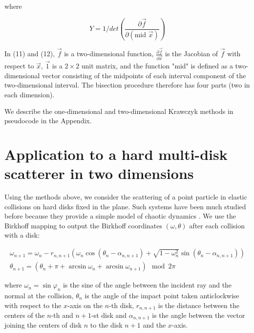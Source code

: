 \documentclass[pre, amsmath, amssymb, onecolumn, showpacs]{revtex4-1}
\begin{document}
\begin{equation}
[Equation (15) in odt draft]
\end{equation}

where

\begin{equation}
Y = 1 / det(\frac{\partial \overrightarrow{f}}{\partial (\text{mid } \overrightarrow{x})})
\end{equation}

In (11) and (12), $\overrightarrow{f}$ is a two-dimensional function, $\frac{\partial \overrightarrow{f}}{\partial \overrightarrow{x}}$ is the Jacobian of $\overrightarrow{f}$ with respect to $\overrightarrow{x}$, $\overrightarrow{1}$ is a $2 \times 2$ unit matrix, and the function "mid" is defined as a two-dimensional vector consisting of the midpoints of each interval component of the two-dimensional interval. The bisection procedure therefore has four parts (two in each dimension).

We describe the one-dimensional and two-dimensional Krawczyk methods in pseudocode in the Appendix.



\section{Application to a hard multi-disk scatterer in two dimensions}

Using the methods above, we consider the scattering of a point particle in elastic collisions on hard disks fixed in the plane. Such systems have been much studied before because they provide a simple model of chaotic dynamics \cite{gaspard2005chaos, eckhardt1987fractal, jung1987cantor, gaspard1989scattering, gaspard1989semiclassical, gaspard1989exact, kovacs1990thermodynamics, korsch1991fractal}. We use the Birkhoff mapping \cite{gaspard2005chaos} to output the Birkhoff coordinates $(\omega, \theta)$ after each collision with a disk:

\begin{equation}
\begin{split}
\omega_{n+1} = \omega_n - r_{n, n+1} (\omega_n \cos(\theta_n - \alpha_{n, n+1}) + \sqrt{1 - \omega_n^2} \sin(\theta_n - \alpha_{n, n+1})) \\
\theta_{n+1} = (\theta_n + \pi + \arcsin \omega_n + \arcsin \omega_{n+1}) \mod 2 \pi
\end{split}
\end{equation}

where $\omega_n = \sin \varphi_n$ is the sine of the angle between the incident ray and the normal at the collision, $\theta_n$ is the angle of the impact point taken anticlockwise with respect to the $x$-axis on the $n$-th disk, $r_{n, n+1}$ is the distance between the centers of the $n$-th and $n+1$-st disk and $\alpha_{n, n+1}$ is the angle between the vector joining the centers of disk $n$ to the disk $n+1$ and the $x$-axis.
\end{document}
